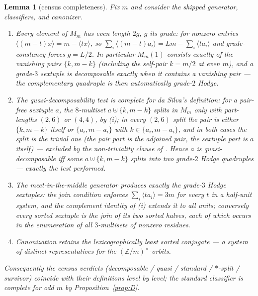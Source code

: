 \documentclass[11pt]{amsart}
\newtheorem{lemma}[theorem]{Lemma}
\theoremstyle{remark}
\newcommand{\Z}{\mathbb{Z}}
\newcommand{\fr}[1]{\langle #1\rangle}
\begin{document}
\begin{lemma}[census completeness]\label{lem:complete}
Fix $m$ and consider the shipped generator, classifiers, and canonizer.
\begin{enumerate}
\item[(i)] Every element of $M_m$ has even length $2g$, $g$ its grade: for nonzero entries
$\fr{(m-t)x}=m-\fr{tx}$, so $\sum_i\fr{(m-t)a_i}=Lm-\sum_i\fr{ta_i}$ and grade-constancy forces
$g=L/2$. In particular $M_m(1)$ consists exactly of the vanishing pairs $\{k,m-k\}$ (including the
self-pair $k=m/2$ at even $m$), and a grade-$3$ sextuple is decomposable exactly when it
contains a vanishing pair --- the complementary quadruple is then automatically grade-$2$ Hodge.
\item[(ii)] The quasi-decomposability test is complete for da Silva's definition: for a pair-free
sextuple $a$, the $8$-multiset $a\uplus\{k,m-k\}$ splits in $M_m$ only with part-lengths $(2,6)$ or
$(4,4)$, by (i); in every $(2,6)$ split the pair is either $\{k,m-k\}$ itself or $\{a_i,m-a_i\}$
with $k\in\{a_i,m-a_i\}$, and in both cases the split is the trivial one (the pair part is the
adjoined pair, the sextuple part is $a$ itself) --- excluded by the non-triviality clause of
\cite[Def.~2.4]{daSilva}. Hence $a$ is quasi-decomposable iff some
$a\uplus\{k,m-k\}$ splits into two grade-$2$ Hodge quadruples --- exactly the test performed.
\item[(iii)] The meet-in-the-middle generator produces exactly the grade-$3$ Hodge sextuples: the
join condition enforces $\sum_i\fr{ta_i}=3m$ for every $t$ in a half-unit system, and the
complement identity of (i) extends it to all units; conversely every sorted sextuple is the join of
its two sorted halves, each of which occurs in the enumeration of \emph{all} $3$-multisets of
nonzero residues.
\item[(iv)] Canonization retains the lexicographically least sorted conjugate --- a system of
distinct representatives for the $(\Z/m)^\times$-orbits.
\end{enumerate}
Consequently the census verdicts (decomposable / quasi / standard / $*$-split / survivor) coincide
with their definitions level by level; the standard classifier is complete for odd $m$ by
Proposition~\ref{prop:D}.
\end{lemma}
\end{document}

